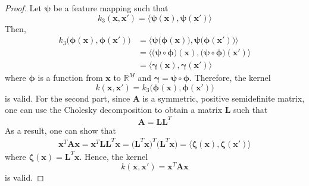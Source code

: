 \begin{proof}
    Let $\bm{\psi}$ be a feature mapping such that
    \[
        k_3(\mathbf{x}, \mathbf{x}') 
        = \langle \bm{\psi}(\mathbf{x}), \bm{\psi}(\mathbf{x}') \rangle
    \] 
    Then,
    \begin{align*}
        k_3\big(\bm{\phi}(\mathbf{x}), \bm{\phi}(\mathbf{x}')\big)
        &= \langle \bm{\psi}\big(\bm{\phi}(\mathbf{x})\big),
            \bm{\psi}\big(\bm{\phi}(\mathbf{x}')\big)\rangle \\
        &= \langle \big(\bm{\psi} \circ \bm{\phi}\big)(\mathbf{x}),
            \big(\bm{\psi} \circ \bm{\phi}\big)(\mathbf{x}')\rangle \\
        &= \langle \bm{\gamma}(\mathbf{x}), \bm{\gamma}(\mathbf{x}')\rangle
    \end{align*}
    where $\bm{\phi}$ is a function from $\mathbf{x}$ to $\mathbb{R}^M$ and
    $\bm{\gamma} = \bm{\psi} \circ \bm{\phi}$. Therefore, the kernel
    \begin{equation}\label{eq:6.19}\tag{6.19} 
        k(\mathbf{x}, \mathbf{x}') = k_3\big(\bm{\phi}(\mathbf{x}),
        \bm{\phi}(\mathbf{x}')\big)
    \end{equation}
    is valid. For the second part, since $\mathbf{A}$ is a 
    symmetric, positive semidefinite matrix, one can use the Cholesky
    decomposition to obtain a matrix $\mathbf{L}$ such that
    \[
        \mathbf{A} = \mathbf{L} \mathbf{L}^T
    \] 
    As a result, one can show that
    \begin{align*}
        \mathbf{x}^T \mathbf{A} \mathbf{x}
        = \mathbf{x}^T \mathbf{L} \mathbf{L}^T \mathbf{x}
        = \big(\mathbf{L}^T \mathbf{x}\big)^T \big(\mathbf{L}^T \mathbf{x}\big)
        = \langle \bm{\zeta}(\mathbf{x}), \bm{\zeta}(\mathbf{x}') \rangle
    \end{align*}
    where $\bm{\zeta}(\mathbf{x}) = \mathbf{L}^T \mathbf{x}$.
    Hence, the kernel
    \begin{equation}\label{eq:6.20}\tag{6.20}
        k(\mathbf{x}, \mathbf{x}') = \mathbf{x}^T \mathbf{A} \mathbf{x}
    \end{equation}
    is valid.
\end{proof} 
